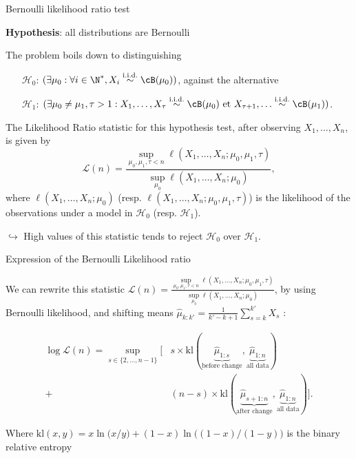 \documentclass[11pt,english,ignorenonframetext,]{beamer}
\begin{document}
\begin{frame}{Bernoulli likelihood ratio test}

  \textbf{Hypothesis}: all distributions are Bernoulli

  The problem boils down to distinguishing
  \begin{itemize}
    \item[$\mathcal{H}_0$:]
    $(\exists \mu_0 : \forall i\in\N^*, X_i \overset{\text{i.i.d.}}{\sim} \cB(\mu_0))$,
    against the alternative
    \item[$\mathcal{H}_1$:]
    $(\exists \mu_0 \neq \mu_1, \tau > 1 : X_1, \ldots, X_\tau \overset{\text{i.i.d.}}{\sim} \cB(\mu_0) \text{~et~} X_{\tau+1}, \ldots \overset{\text{i.i.d.}}{\sim} \cB(\mu_1))$.
  \end{itemize}

  \pause

  The \alert{Likelihood Ratio statistic} for this hypothesis test, after observing $X_1,\dots,X_n$, is given by
  \[ \mathcal{L}(n) = \frac{\sup\limits_{\mu_0,\mu_1,\tau < n}\ell(X_1,\dots,X_n ; \mu_0,\mu_1,\tau)}{\sup\limits_{\mu_0}\ell(X_1,\dots,X_n ;\mu_0)},\]
  where $\ell(X_1,\dots,X_n ; \mu_0)$ (resp. $\ell(X_1,\dots,X_n ; \mu_0,\mu_1,\tau)$) is the likelihood of the observations under a model in $\mathcal{H}_0$ (resp. $\mathcal{H}_1$).

  \pause

  \alert{$\hookrightarrow$ High values of this statistic tends to reject $\mathcal{H}_0$ over $\mathcal{H}_1$.}

\end{frame}

\begin{frame}{Expression of the Bernoulli Likelihood ratio}

  We can rewrite this statistic
  $\mathcal{L}(n) = \frac{\sup\limits_{\mu_0,\mu_1,\tau < n}\ell(X_1,\dots,X_n ; \mu_0,\mu_1,\tau)}{\sup\limits_{\mu_0}\ell(X_1,\dots,X_n ;\mu_0)}$,
  by using Bernoulli likelihood, and shifting means $\widehat{\mu}_{k:k'} = \frac{1}{k'-k+1} \sum_{s=k}^{k'} X_s$ :

  \begin{align*}
    \log \mathcal{L}(n) = \sup_{s \in \{2,\dots,n-1\}} \bigl[
      & s \times \mathrm{kl} (\underbrace{\widehat{\mu}_{1:s}}_{\text{before change}},\underbrace{\widehat{\mu}_{1:n}}_{\text{all data}} ) \\
      + & (n-s) \times \mathrm{kl} (\underbrace{\widehat{\mu}_{s+1:n}}_{\text{after change}},\underbrace{\widehat{\mu}_{1:n}}_{\text{all data}} ) \bigr].
  \end{align*}

  Where $\mathrm{kl}(x,y) =x \ln\bigl(x/y\bigr) + (1-x)\ln\bigl((1-x)/(1-y)\bigr)$ is the binary relative entropy

\end{frame}
\end{document}
